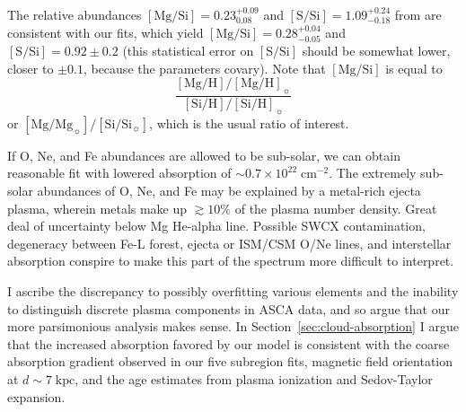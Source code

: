 \documentclass[twocolumn,tighten,trackchanges]{aastex61}
\newcommand*{\mt}{\mathrm}
\newcommand*{\unit}[1]{\;\mt{#1}}  %
\newcommand*{\abt}{\mathord{\sim}} %
\newcommand*{\nH}{N_{\mathrm{H}}}
\newcommand*{\nHUnits}{\times 10^{22} \unit{cm^{-2}}}
\newcommand*{\TauUnits}{\unit{s\;cm^{-3}}}
\begin{document}
The relative abundances
  $[\mt{Mg}/\mt{Si}] = 0.23^{+0.09}_{0.08}$ and
  $[\mt{S}/\mt{Si}] = 1.09^{+0.24}_{-0.18}$ from \citet{rakowski2001}
are consistent with our fits, which yield $[\mt{Mg}/\mt{Si}] = 0.28^{+0.04}_{-0.05}$
and $[\mt{S}/\mt{Si}] = 0.92 \pm 0.2$ (this statistical error on
$[\mt{S}/\mt{Si}]$ should be somewhat lower, closer to $\pm 0.1$, because the
parameters covary).
Note that $[\mt{Mg}/\mt{Si}]$ is equal to
\[
    \frac{[\mt{Mg}/\mt{H}] / [\mt{Mg}/\mt{H}]_{\sun}}
         {[\mt{Si}/\mt{H}] / [\mt{Si}/\mt{H}]_{\sun}}
\]
or $[\mt{Mg}/\mt{Mg}_{\sun}] / [\mt{Si}/\mt{Si}_{\sun}]$,
which is the usual ratio of interest.


If O, Ne, and Fe abundances are allowed to be sub-solar, we can obtain
reasonable fit with lowered absorption of $\abt 0.7 \nHUnits$.
The extremely sub-solar abundances of O, Ne, and Fe may be explained by a
metal-rich ejecta plasma, wherein metals make up $\gtrsim 10\%$ of the plasma
number density.
Great deal of uncertainty below Mg He-alpha line.
Possible SWCX contamination, degeneracy between Fe-L forest, ejecta or ISM/CSM
O/Ne lines, and interstellar absorption conspire to make this part of the
spectrum more difficult to interpret.

I ascribe the discrepancy to possibly overfitting various elements and the
inability to distinguish discrete plasma components in ASCA data, and so argue
that our more parsimonious analysis makes sense.
In Section~\ref{sec:cloud-absorption} I argue that the increased absorption favored by our
model is consistent with the coarse absorption gradient observed in our five
subregion fits, magnetic field orientation at $d \sim 7 \unit{kpc}$, and the
age estimates from plasma ionization and Sedov-Taylor expansion.
\end{document}
